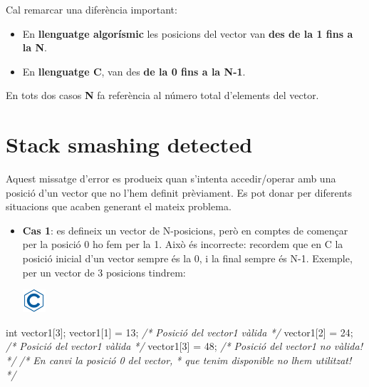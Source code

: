 \documentclass[
]{book}
\newenvironment{Shaded}{\begin{snugshade}}{\end{snugshade}}
\newcommand{\CommentTok}[1]{\textcolor[rgb]{0.56,0.35,0.01}{\textit{#1}}}
\newcommand{\DataTypeTok}[1]{\textcolor[rgb]{0.13,0.29,0.53}{#1}}
\newcommand{\DecValTok}[1]{\textcolor[rgb]{0.00,0.00,0.81}{#1}}
\newcommand{\NormalTok}[1]{#1}
\providecommand{\tightlist}{%
  \setlength{\itemsep}{0pt}\setlength{\parskip}{0pt}}
\begin{document}
Cal remarcar una diferència important:

\begin{itemize}
\tightlist
\item
  En \textbf{llenguatge algorísmic} les posicions del vector van \textbf{des de la 1 fins a la N}.
\item
  En \textbf{llenguatge C}, van des \textbf{de la 0 fins a la N-1}.
\end{itemize}

En tots dos casos \textbf{N} fa referència al número total d'elements del vector.

\hypertarget{stack-smashing-detected}{%
\section{Stack smashing detected}\label{stack-smashing-detected}}

Aquest missatge d'error es produeix quan s'intenta accedir/operar amb una posició d'un vector que no l'hem definit prèviament. Es pot donar per diferents situacions que acaben generant el mateix problema.

\begin{itemize}
\tightlist
\item
  \textbf{Cas 1}: es defineix un vector de N-posicions, però en comptes de començar per la posició 0 ho fem per la 1. Això és incorrecte: recordem que en C la posició inicial d'un vector sempre és la 0, i la final sempre és N-1. Exemple, per un vector de 3 posicions tindrem:

  \includegraphics{./img/c.png}
\end{itemize}

\begin{Shaded}
\begin{Highlighting}[]
\DataTypeTok{int}\NormalTok{ vector1[}\DecValTok{3}\NormalTok{];}
\NormalTok{vector1[}\DecValTok{1}\NormalTok{] = }\DecValTok{13}\NormalTok{;  }\CommentTok{/* Posició del vector1 vàlida */}
\NormalTok{vector1[}\DecValTok{2}\NormalTok{] = }\DecValTok{24}\NormalTok{;  }\CommentTok{/* Posició del vector1 vàlida */}
\NormalTok{vector1[}\DecValTok{3}\NormalTok{] = }\DecValTok{48}\NormalTok{;  }\CommentTok{/* Posició del vector1 no vàlida! */}
\CommentTok{/* En canvi la posició 0 del vector, }
\CommentTok{ * que tenim disponible no l\textquotesingle{}hem utilitzat! }
\CommentTok{ */}
\end{Highlighting}
\end{Shaded}
\end{document}
